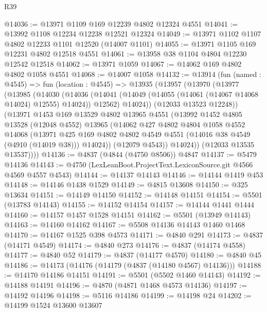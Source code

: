 \begin{lexlean}{R39}
\begin{coremodule}
@14036 := @13971 @1109 @169 @12239 @4802 @12324 @4551
@14041 := @13992 @1108 @12234 @12238 @12521 @12324
@14049 := @13971 @1102 @1107 @4802 @12233 @1101 @12520 (@14007 @1101)
@14055 := @13971 @1105 @169 @12231 @4802 @12518 @4551
@14061 := @13958 @38 @1104 @4804 @12230 @12542 @12518
@14062 := @13971 @1059
@14067 := @14062 @169 @4802 @4802 @1058 @4551
@14068 := @14007 @1058
@14132 := @13914
    (fun (named : @4545) =>
    fun (location : @4545) =>
    @13935
      (@13957
        (@13970
          (@13977
            (@13985
              (@14030
                (@14036
                  (@14041 (@14049 (@14055 (@14061 (@14067 @14068 @14024) @12555) @14024)) @12562)
                  @14024))
              (@12033 @13523 @12248))
            (@13971
              @1453
              @169
              @13529
              @4802
              @13965
              @4551
              (@13992
                @1452
                @4805
                @13528
                (@12048 @4552)
                @13965
                (@14062
                  @427
                  @4802
                  @4804
                  @1058
                  @4552
                  @14068
                  (@13971
                    @425
                    @169
                    @4802
                    @4802
                    @4549
                    @4551
                    (@14016 @38 @4549 (@4910 (@14019 @38)))
                    @14024))
                (@12079 @4543))
              @14024))
          (@12033 @13535 @13537))))
@14136 := @4837 (@4844 (@4750 @8506)) @4847
@14137 := @5479 @14136
@14143 := @4750 (LexLeanBoot.ProjectText.LexiconSource.git @4566 @4569 @4557 @4543)
@14144 := @14137 @14143
@14146 := @14144 @1419 @453
@14148 := @14146 @1438 @1529
@14149 := @4815 @13608
@14150 := @325 @13634
@14151 := @14149 @14150
@14152 := @14148 @14151
@14154 := @5501 (@13783 @14143)
@14155 := @14152 @14154
@14157 := @14144 @1441 @1444
@14160 := @14157 @1457 @1528 @14151
@14162 := @5501 (@13949 @14143)
@14163 := @14160 @14162
@14167 := @5508 @14136 @14143 @1460 @1468
@14170 := @14167 @1525 @398 @4573
@14171 := @4840 @291
@14173 := @4837 (@14171 @4549)
@14174 := @4840 @273
@14176 := @4837 (@14174 @4558)
@14177 := @4840 @52
@14179 := @4837 (@14177 @4570)
@14180 := @4840 @45
@14186 := @14173 (@14176 (@14179 (@4837 (@14180 @4567) @14136)))
@14188 := @14170 @14186 @14151
@14191 := @5501 (@5502 @1460 @14143)
@14192 := @14188 @14191
@14196 := @4870 (@4871 @1468 @4573 @14136)
@14197 := @14192 @14196
@14198 := @5116 @14186
@14199 := @14198 @24
@14202 := @14199 @1524 @13600 @13607

\end{coremodule}
\end{lexlean}
